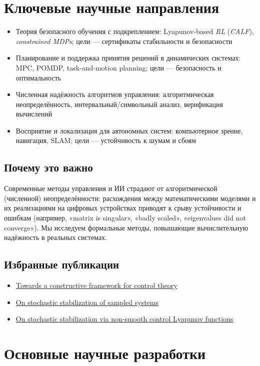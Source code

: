 \documentclass[12pt,a4paper]{article}
\begin{document}
\section{Ключевые научные направления}
\begin{itemize}
    \item Теория безопасного обучения с подкреплением: Lyapunov-based \textit{RL} (\textit{CALF}), \textit{constrained MDPs}; цели --- сертификаты стабильности и безопасности
    \item Планирование и поддержка принятия решений в динамических системах: MPC, POMDP, task-and-motion planning; цели --- безопасность и оптимальность
    \item Численная надёжность алгоритмов управления: алгоритмическая неопределённость, интервальный/символьный анализ, верификация вычислений
    \item Восприятие и локализация для автономных систем: компьютерное зрение, навигация, SLAM; цели --- устойчивость к шумам и сбоям
\end{itemize}

\subsection*{Почему это важно}
Современные методы управления и ИИ страдают от алгоритмической (численной) неопределённости: расхождения между математическими моделями и их реализациями на цифровых устройствах приводят к срыву устойчивости и ошибкам (например, «matrix is singular», «badly scaled», «eigenvalues did not converge»). Мы исследуем формальные методы, повышающие вычислительную надёжность в реальных системах.

\subsection*{Избранные публикации}
\begin{itemize}
    \item \href{https://arxiv.org/abs/2501.02267}{Towards a constructive framework for control theory}
    \item \href{https://arxiv.org/abs/2105.07152}{On stochastic stabilization of sampled systems}
    \item \href{https://arxiv.org/abs/2205.13409}{On stochastic stabilization via non-smooth control Lyapunov functions}
\end{itemize}

\section{Основные научные разработки}
\end{document}
